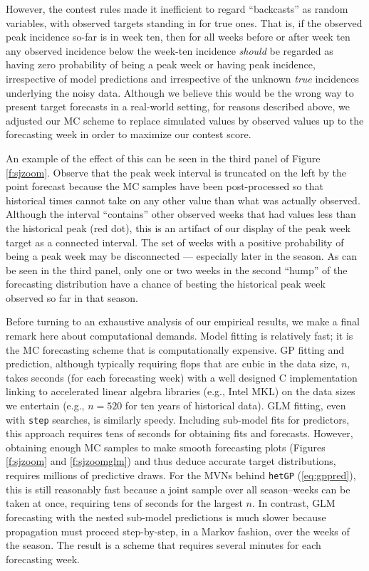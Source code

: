 \documentclass[12pt]{article}
\begin{document}
However, the contest rules made it inefficient to regard ``backcasts'' as
random variables, with observed targets standing in for true ones. That is, if
the observed peak incidence so-far is in week ten, then for all weeks before
or after week ten any observed incidence below the week-ten incidence {\em
should} be regarded as having zero probability of being a peak week or having
peak incidence, irrespective of model predictions and irrespective of the
unknown {\em true} incidences underlying the noisy data. Although we believe
this would be the wrong way to present target forecasts in a real-world
setting, for reasons described above, we adjusted our MC scheme to replace
simulated values by observed values up to the forecasting week in order to
maximize our contest score.

An example of the effect of this can be seen in the third panel of Figure
\ref{f:sjzoom}.  Observe that the peak week interval is truncated on the left
by the point forecast because the MC samples have been post-processed so that
historical times cannot take on any other value than what was actually
observed.  Although the interval ``contains'' other observed weeks that had
values less than the historical peak (red dot), this is an artifact of our
display of the peak week target as a connected interval.  The set of weeks
with a positive probability of being a peak week may be
disconnected --- especially later in the season.  As can be seen in the third
panel, only one or two weeks in the second ``hump'' of the forecasting
distribution have a chance of besting the historical peak week observed so far
in that season.

Before turning to an exhaustive analysis of our empirical results, we make a
final remark here about computational demands.  Model fitting is relatively
fast; it is the MC forecasting scheme that is computationally expensive.  GP
fitting and prediction, although typically requiring flops that are cubic in
the data size, $n$, takes seconds (for each forecasting week) with a well
designed {\sf C} implementation linking to accelerated linear algebra
libraries (e.g., Intel MKL) on the data sizes we entertain (e.g., $n=520$ for
ten years of historical data).  GLM fitting, even with {\tt step} searches, is
similarly speedy. Including sub-model fits for predictors, this approach
requires tens of seconds for obtaining fits and forecasts. However, obtaining
enough MC samples to make smooth forecasting plots (Figures \ref{f:sjzoom} and
\ref{f:sjzoomglm}) and thus deduce accurate target distributions, requires
millions of predictive draws. For the MVNs behind {\tt hetGP}
(\ref{eq:gppred}), this is still reasonably fast because a joint sample over
all season--weeks can be taken at once, requiring tens of seconds for the
largest $n$. In contrast, GLM forecasting with the nested sub-model
predictions is much slower because propagation must proceed step-by-step, in a
Markov fashion, over the weeks of the season.  The result is a scheme that
requires several minutes for each forecasting week.
\end{document}
